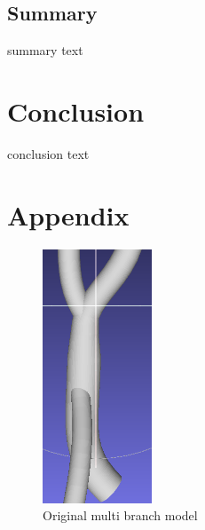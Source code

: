 \documentclass[11p, titlepage]{article}
\begin{document}
\subsection{Summary}

summary text

\section{Conclusion}

conclusion text

\pagebreak



\section{Appendix}

\begin{figure}[h]
\centering
\includegraphics[width=0.29\textwidth]{mb}
\caption{Original multi branch model\label{fig:model}}
\end{figure}
\end{document}
